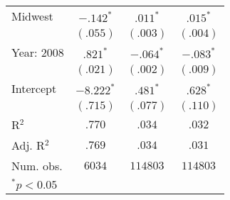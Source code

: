 \begin{tabular}{l c c c}
Midwest                  & $-.142^{*}$  & $.011^{*}$  & $.015^{*}$  \\
                         & $(.055)$     & $(.003)$    & $(.004)$    \\
Year: 2008               & $.821^{*}$   & $-.064^{*}$ & $-.083^{*}$ \\
                         & $(.021)$     & $(.002)$    & $(.009)$    \\
Intercept                & $-8.222^{*}$ & $.481^{*}$  & $.628^{*}$  \\
                         & $(.715)$     & $(.077)$    & $(.110)$    \\
\hline
R$^2$                    & $.770$       & $.034$      & $.032$      \\
Adj. R$^2$               & $.769$       & $.034$      & $.031$      \\
Num. obs.                & $6034$       & $114803$    & $114803$    \\
\hline
\multicolumn{4}{l}{\scriptsize{$^{*}p<0.05$}}
\end{tabular}
